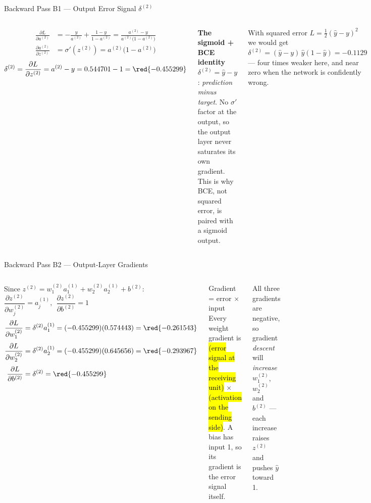 \documentclass[aspectratio=169,10pt]{beamer}
\begin{document}
\begin{frame}{Backward Pass B1 --- Output Error Signal $\delta^{(2)}$}
\begin{columns}[T]
{\small
\begin{align*}
\frac{\partial L}{\partial a^{(2)}}&=-\frac{y}{a^{(2)}}+\frac{1-y}{1-a^{(2)}}=\frac{a^{(2)}-y}{a^{(2)}\bigl(1-a^{(2)}\bigr)}\\[3pt]
\frac{\partial a^{(2)}}{\partial z^{(2)}}&=\sigma'(z^{(2)})=a^{(2)}\bigl(1-a^{(2)}\bigr)
\end{align*}}
{\small\[
\delta^{(2)}=\frac{\partial L}{\partial z^{(2)}}=a^{(2)}-y=0.544701-1=\red{-0.455299}
\]}
\begin{rbox}\textbf{The sigmoid + BCE identity}\\[2pt]\scriptsize $\delta^{(2)}=\hat y-y$: \emph{prediction minus target}. No $\sigma'$ factor at the output, so the output layer never saturates its own gradient. This is why BCE, not squared error, is paired with a sigmoid output.\end{rbox}
\begin{wbox}\scriptsize With squared error $L=\tfrac12(\hat y-y)^2$ we would get $\delta^{(2)}=(\hat y-y)\,\hat y(1-\hat y)=-0.1129$ --- four times weaker here, and near zero when the network is confidently wrong.\end{wbox}
\end{columns}
\end{frame}

\begin{frame}{Backward Pass B2 --- Output-Layer Gradients}
\begin{columns}[T]
Since $z^{(2)}=w^{(2)}_1a^{(1)}_1+w^{(2)}_2a^{(1)}_2+b^{(2)}$:\quad $\dfrac{\partial z^{(2)}}{\partial w^{(2)}_j}=a^{(1)}_j,\ \ \dfrac{\partial z^{(2)}}{\partial b^{(2)}}=1$
{\small
\begin{align*}
\frac{\partial L}{\partial w^{(2)}_1}&=\delta^{(2)}a^{(1)}_1=(-0.455299)(0.574443)=\red{-0.261543}\\[3pt]
\frac{\partial L}{\partial w^{(2)}_2}&=\delta^{(2)}a^{(1)}_2=(-0.455299)(0.645656)=\red{-0.293967}\\[3pt]
\frac{\partial L}{\partial b^{(2)}}&=\delta^{(2)}=\red{-0.455299}
\end{align*}}
\begin{cbox}{Gradient = error $\times$ input}
Every weight gradient is \hl{(error signal at the receiving unit)} $\times$ \hl{(activation on the sending side)}. A bias has input 1, so its gradient is the error signal itself.
\end{cbox}
\begin{ibox}\scriptsize All three gradients are negative, so gradient \emph{descent} will \emph{increase} $w^{(2)}_1$, $w^{(2)}_2$ and $b^{(2)}$ --- each increase raises $z^{(2)}$ and pushes $\hat y$ toward 1.\end{ibox}
\end{columns}
\end{frame}
\end{document}
